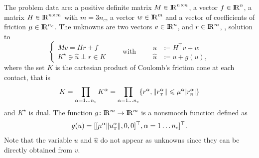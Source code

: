 The problem data are: a positive definite matrix ${M} \in \mathrm{I\!R}^{n \times n}$, a vector $ {f} \in \mathrm{I\!R}^n$, a matrix  ${H} \in \mathrm{I\!R}^{n \times m}$ with $m= 3n_c$, a vector $w \in \mathrm{I\!R}^{m}$ and a vector of coefficients of friction $\mu \in \mathrm{I\!R}^{n_c}$.
The unknowns are two vectors $ {v} \in \mathrm{I\!R}^n$,  and $r\in \mathrm{I\!R}^m$, , solution to
\begin{equation}\label{eq:soccp1-intro}
 \begin{cases}
  M v = {H} {r} + {f}\\
  K^\star \ni {\hat u} \perp r \in K
 \end{cases}\qquad\text{with}\qquad
 \begin{aligned}
    u &\coloneqq H^\top v + w\\
    \hat u &\coloneqq u + g(u),
   \end{aligned}
\end{equation}
where the set $K$ is the cartesian product of Coulomb's friction cone at each contact, that is
\begin{equation}
  \label{eq:CC}
  K = \prod_{\alpha=1\ldots n_c} K^{\alpha}  = \prod_{\alpha=1\ldots n_c} \{r^\alpha, \|r^\alpha_\t \| \leq \mu^\alpha |r^\alpha_\n| \}
\end{equation}
and $K^\star$ is dual. The function $g\colon\mathrm{I\!R}^m\to\mathrm{I\!R}^m$ is a nonsmooth function defined as
\begin{equation}
g(u) = [[\mu^\alpha  \|u^\alpha_\t\|, 0, 0]^\top, \alpha = 1\ldots n_c]^\top\label{eq:gg}. 
\end{equation} Note that the variable $u$ and $\hat u$  do not appear as unknowns since they can be directly obtained from $v$.



